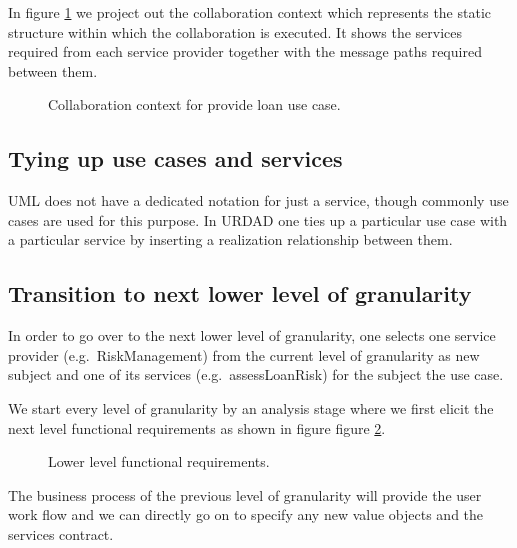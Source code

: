 \documentclass[reviewcopy]{elsart}
\begin{document}
In figure \ref{fig:provideLoanCollaborationContext} we project out the collaboration context
which represents the static structure within
which the collaboration is executed. It shows the services required from each service
provider together with the message paths required between them.

\begin{figure}
  \centering
  \caption{Collaboration context for provide loan use case.}
  \label{fig:provideLoanCollaborationContext}
\end{figure}



\subsection{Tying up use cases and services}

UML does not have a dedicated notation for just a service, though commonly
use cases are used for this purpose. In URDAD one ties up a particular use case
with a particular service by inserting a realization relationship between them.


\subsection{Transition to next lower level of granularity}

In order to go over to the next lower level of granularity, one selects one
service provider (e.g.\ RiskManagement) from the current level of granularity as new
subject and one of its services (e.g.\ assessLoanRisk) for the subject the use case.

We start every level of granularity by an analysis stage where we first elicit the next level functional requirements as shown in figure figure \ref{fig:assessLoanRiskFunctionalRequirements}.

\begin{figure}
  \centering
  \caption{Lower level functional requirements.}
  \label{fig:assessLoanRiskFunctionalRequirements}
\end{figure}

The business process of the previous level of granularity will provide
the user work flow and we can directly go on to specify any new value objects
and the services contract.
\end{document}
